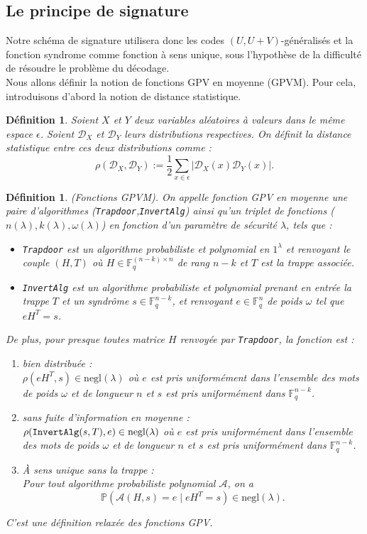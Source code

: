 \documentclass[12pt]{article}
\theoremstyle{plain}
\newtheorem{defi}[thm]{Définition}
\newcommand{\F}{\mathbb{F}}
\begin{document}
\subsection{Le principe de signature}

Notre schéma de signature utilisera donc les codes $(U,U+V)$-généralisés et la fonction syndrome comme fonction à sens unique, sous l'hypothèse de la difficulté de résoudre le problème du décodage. \\

\noindent Nous allons définir la notion de fonctions GPV en moyenne (GPVM). Pour cela, introduisons d'abord la notion de distance statistique.

\begin{defi}
Soient $X$ et $Y$ deux variables aléatoires à valeurs dans le même espace $\epsilon$. 
Soient $\mathcal{D}_X$ et $\mathcal{D}_Y$ leurs distributions respectives. On définit la distance statistique entre ces deux distributions comme :
$$ \rho(\mathcal{D}_X,\mathcal{D}_Y) := \frac{1}{2} \sum_{x \in \epsilon} |\mathcal{D}_X(x) \mathcal{D}_Y(x)|.$$
\end{defi}

\begin{defi} (Fonctions GPVM). On appelle fonction GPV en moyenne une paire d'algorithmes (\verb|Trapdoor|,\verb|InvertAlg|) ainsi qu'un triplet de fonctions ($n(\lambda),k(\lambda),\omega(\lambda)$) en fonction d'un paramètre de sécurité $\lambda$, tels que :
\begin{itemize}
\item \verb|Trapdoor| est un algorithme probabiliste et polynomial en $1^\lambda$ et renvoyant le couple $(H,T)$ où $H \in \F_q^{(n-k) \times n}$ de rang $n-k$ et $T$ est la trappe associée.
\item \verb|InvertAlg| est un algorithme probabiliste et polynomial prenant en entrée la trappe $T$ et un syndrôme $s \in \F_q^{n-k}$, et renvoyant $e \in \F_q^{n}$ de poids $\omega$ tel que $eH^T = s$.
\end{itemize}
De plus, pour \textit{presque toutes} matrice $H$ renvoyée par \verb|Trapdoor|, la fonction est :
\begin{enumerate}
\item bien distribuée : \\
$\rho(eH^T,s) \in \text{negl}(\lambda)$ où $e$ est pris uniformément dans l'ensemble des mots de poids $\omega$ et de longueur $n$ et $s$ est pris uniformément dans $\F_q^{n-k}$. 
\item sans fuite d'information \textit{en moyenne} : \\
$ \rho(\verb|InvertAlg|(s,T),e) \in \text{negl}(\lambda)$ où $e$ est pris uniformément dans l'ensemble des mots de poids $\omega$ et de longueur $n$ et $s$ est pris uniformément dans $\F_q^{n-k}$. 
\item \`A sens unique sans la trappe : \\
Pour tout algorithme probabiliste polynomial $\mathcal{A}$, on a 
$$\mathbb{P}(\mathcal{A}(H,s) = e \;| \;eH^T = s) \in \text{negl}(\lambda).$$
\end{enumerate}
C'est une définition relaxée des fonctions GPV.
\end{defi}
\end{document}
